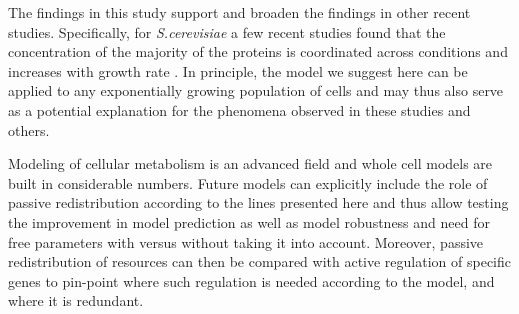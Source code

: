 \documentclass[10pt,letterpaper]{article}
\begin{document}
The findings in this study support and broaden the findings in other recent studies.
Specifically, for \emph{S.cerevisiae} a few recent studies found that the concentration of the majority of the proteins is coordinated across conditions and increases with growth rate \cite{Keren2013,Gasch2000,Brauer2008a}.
In principle, the model we suggest here can be applied to any exponentially growing population of cells and may thus also serve as a potential explanation for the phenomena observed in these studies and others.

Modeling of cellular metabolism is an advanced field and whole cell models are built in considerable numbers.
Future models can explicitly include the role of passive redistribution according to the lines presented here and thus allow testing the improvement in model prediction as well as model robustness and need for free parameters with versus without taking it into account.
Moreover, passive redistribution of resources can then be compared with active regulation of specific genes to pin-point where such regulation is needed according to the model, and where it is redundant.
\end{document}
